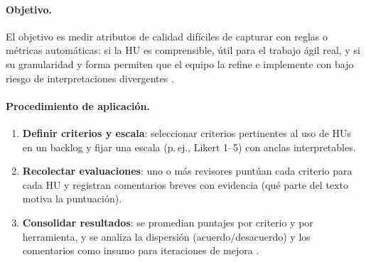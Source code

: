 \paragraph{Objetivo.}
El objetivo es medir atributos de calidad difíciles de capturar con reglas o métricas automáticas: si la HU es comprensible, útil para el trabajo ágil real, y si su granularidad y forma permiten que el equipo la refine e implemente con bajo riesgo de interpretaciones divergentes \cite{yu2026evaluating_genai_quality_multicase}.

\paragraph{Procedimiento de aplicación.}
\begin{enumerate}
    \item \textbf{Definir criterios y escala}: seleccionar criterios pertinentes al uso de HUs en un backlog y fijar una escala (p.\,ej., Likert 1--5) con anclas interpretables.
    \item \textbf{Recolectar evaluaciones}: uno o más revisores puntúan cada criterio para cada HU y registran comentarios breves con evidencia (qué parte del texto motiva la puntuación).
    \item \textbf{Consolidar resultados}: se promedian puntajes por criterio y por herramienta, y se analiza la dispersión (acuerdo/desacuerdo) y los comentarios como insumo para iteraciones de mejora \cite{yu2026evaluating_genai_quality_multicase}.
\end{enumerate}

